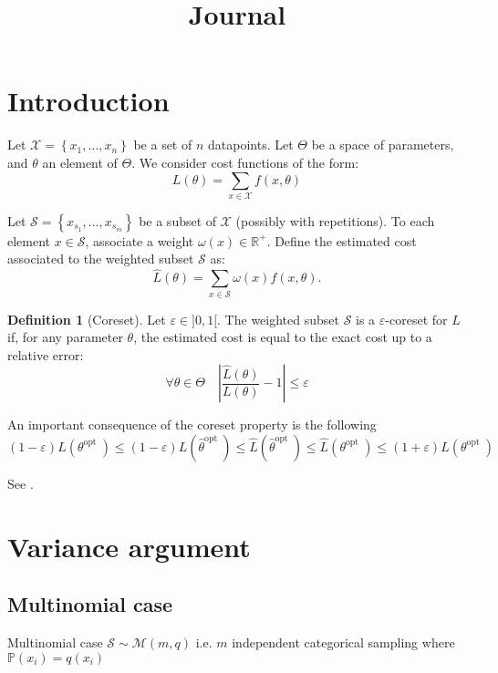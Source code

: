 \documentclass{article}
\title{Journal}
\renewcommand{\epsilon}{\varepsilon}
\theoremstyle{definition}
\newtheorem{definition}{Definition}[section]
\begin{document}
	
	\maketitle
	
	\section{Introduction}
	
	Let $\mathcal{X}=\left\{x_{1}, \ldots, x_{n}\right\}$ be a set of $n$ datapoints. Let $\Theta$ be a space of parameters, and $\theta$ an element of $\Theta$. We consider cost functions of the form:
	$$
	L(\theta)=\sum_{x \in \mathcal{X}} f(x, \theta)
	$$
	
	Let $\mathcal{S}=\left\{x_{s_{1}}, \ldots, x_{s_{m}}\right\}$ be a subset of $\mathcal{X}$ (possibly with repetitions). To each element $x \in \mathcal{S}$, associate a weight $\omega\left(x\right) \in \mathbb{R}^{+}$. Define the estimated cost associated to the weighted subset $\mathcal{S}$ as:
	$$
	\hat{L}(\theta)=\sum_{x \in \mathcal{S}} \omega\left(x\right) f\left(x, \theta\right) .
	$$
	\begin{definition}[Coreset]
			Let $\epsilon \in {]}0,1{[}$. The weighted subset $\mathcal{S}$ is a $\epsilon$-coreset for $L$ if, for any parameter $\theta$, the estimated cost is equal to the exact cost up to a relative error:
		\begin{equation}
			\forall \theta \in \Theta \quad\left|\frac{\hat{L}(\theta)}{L(\theta)}-1\right| \le \epsilon 
		\end{equation}
	\end{definition}

An important consequence of the coreset property is the following
$$
(1-\epsilon) L\left(\theta^{\text {opt }}\right) \le(1-\epsilon) L\left( \hat{\theta}^{\text {opt }}\right) \le \hat{L}\left( \hat{\theta}^{\text {opt }}\right) \le \hat{L}\left( \theta^{\text {opt }}\right) \le(1+\epsilon) L\left( \theta^{\text {opt }}\right)
$$

See \cite{bachem2017coresetML}.

\section{Variance argument}
\subsection{Multinomial case}
Multinomial case $\mathcal S \sim \mathcal M(m, q)$ i.e. $m$ independent categorical sampling where $\mathbb P(x_i)  = q(x_i)$
\end{document}
